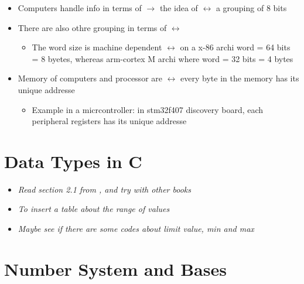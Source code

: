\begin{itemize}

\item Computers handle info in terms of  $\rightarrow$ the idea of  $\leftrightarrow$ a grouping of 8 bits

\item There are also othre grouping in terms of  $\leftrightarrow$  

	\begin{itemize}
	\item The word size is machine dependent $\leftrightarrow$ on a x-86 archi word = 64 bits = 8 byetes, whereas arm-cortex M archi where word = 32 bits = 4 bytes
	\end{itemize}

\item Memory of computers and processor are  $\leftrightarrow$ every byte in the memory has its unique addresse

	\begin{itemize}
	\item Example in a micrcontroller: in stm32f407 discovery board, each peripheral registers has its unique addresse
	\end{itemize}

\end{itemize}

\section{Data Types in C}


\begin{itemize}

\item \textit{Read section 2.1 from \cite{book_Embedded_systems_ARM_Cortex_M_YifengZhu}, and try with other books}

\item \textit{To insert a table about the range of values}

\item  \textit{Maybe see if there are some codes about limit value, min and max}

\end{itemize}


\section{Number System and Bases}

